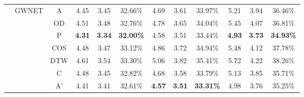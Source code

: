 \begin{table}[t!]
\begin{center}
{\begin{tabular}{c|c|c|ccc|ccc|ccc}
                \cline{2-12}
                                               & \multirow{7}{*}{GWNET} & A     & 4.45                                  & 3.45                                  & 32.66\%                               & 4.69          & 3.61          & 33.97\%          & 5.21          & 3.94          & 36.46\%          \\
                                               &                        & OD    & 4.51                                  & 3.48                                  & 32.76\%                               & 4.78          & 3.65          & 34.04\%          & 5.45          & 4.07          & 36.81\%          \\
                                               &                        & P     & \textbf{4.31}                         & \textbf{3.34}                         & \textbf{32.00\%}                      & 4.58          & 3.51          & 33.44\%          & \textbf{4.93} & \textbf{3.73} & \textbf{34.93\%} \\
                                               &                        & COS   & 4.48                                  & 3.47                                  & 33.12\%                               & 4.86          & 3.72          & 34.94\%          & 5.48          & 4.12          & 37.78\%          \\
                                               &                        & DTW   & 4.61                                  & 3.54                                  & 33.30\%                               & 5.06          & 3.82          & 35.41\%          & 5.72          & 4.22          & 38.26\%          \\
                                               &                        & C     & 4.48                                  & 3.45                                  & 32.82\%                               & 4.68          & 3.58          & 33.79\%          & 5.13          & 3.85          & 35.71\%          \\
                                               &                        & A'    & 4.41                                  & 3.41                                  & 32.61\%                               & \textbf{4.57} & \textbf{3.51} & \textbf{33.31\%} & 4.98          & 3.76          & 35.25\%          \\
                \hline
                \hline


\end{tabular}}
\end{center}
\end{table}
